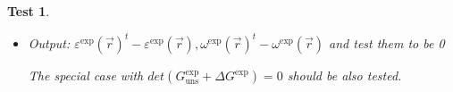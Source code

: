 \documentclass[12pt, titlepage]{article}
\newtheorem{Test}{Test}
\begin{document}
\begin{Test}
\begin{itemize}
\begin{itemize}
	\newline
	$\begin{cases} 
	\forall \vec{r} \in \mathbb{I}, \ \varepsilon^{\text{exp}}(\vec{r}) = \begin{bmatrix}
	0 & -\frac{1}{11} \\
	-\frac{1}{11} & 0
	\end{bmatrix}  \\
	\forall \vec{r} \in \mathbb{I}, \  \omega^{\text{exp}}(\vec{r}) = \begin{bmatrix}
	0 & 0 \\
	0 & 0 
	\end{bmatrix} 
	\end{cases}$
	\item Pure rotation,\\
	\newline
	$\begin{cases} 
	\forall \vec{r} \in \mathbb{I}, \ \varepsilon^{\text{exp}}(\vec{r}) = \begin{bmatrix}
	0 & 0 \\
	0 & 0
	\end{bmatrix}  \\
	\forall \vec{r} \in \mathbb{I}, \  \omega^{\text{exp}}(\vec{r}) = \begin{bmatrix}
	0 & \frac{1}{11} \\
	-\frac{1}{11} & 0 
	\end{bmatrix} 
	\end{cases}$
	\end{itemize}

\item Output:  ${\varepsilon^{\text{exp}}(\vec{r})}^{t}-\varepsilon^{\text{exp}}(\vec{r}), {\omega^{\text{exp}}(\vec{r})}^{t}- \omega^{\text{exp}}(\vec{r})$  and test them to be 0

The special case with $det(G_{\text{uns}}^{\text{exp}}+\Delta G^{\text{exp}})=0$ should be also tested.
\end{itemize}
\end{Test}
\end{document}

